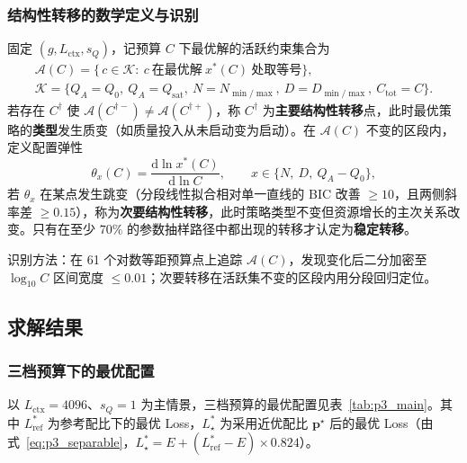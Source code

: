 \subsubsection{结构性转移的数学定义与识别}

\begin{definition}[结构性转移]
固定 $(g,L_{\mathrm{ctx}},s_Q)$，记预算 $C$ 下最优解的活跃约束集合为
\begin{equation}
\begin{gathered}
\mathcal A(C)=\big\{\,c\in\mathcal K:\ c\ \text{在最优解}\ x^*(C)\ \text{处取等号}\big\},\\
\mathcal K=\{Q_A=Q_0,\ Q_A=Q_{\mathrm{sat}},\ N=N_{\min/\max},\ D=D_{\min/\max},\ C_{\mathrm{tot}}=C\}.
\end{gathered}
\label{eq:p3_active}
\end{equation}
若存在 $C^\dagger$ 使 $\mathcal A(C^{\dagger-})\neq\mathcal A(C^{\dagger+})$，称 $C^\dagger$ 为\textbf{主要结构性转移}点，此时最优策略的\textbf{类型}发生质变（如质量投入从未启动变为启动）。在 $\mathcal A(C)$ 不变的区段内，定义配置弹性
\begin{equation}
\theta_x(C)=\frac{\mathrm d\ln x^*(C)}{\mathrm d\ln C},\qquad x\in\{N,\ D,\ Q_A-Q_0\},
\label{eq:p3_elasticity}
\end{equation}
若 $\theta_x$ 在某点发生跳变（分段线性拟合相对单一直线的 BIC 改善 $\ge10$\cite{schwarz1978estimating}，且两侧斜率差 $\ge0.15$），称为\textbf{次要结构性转移}，此时策略类型不变但资源增长的主次关系改变。只有在至少 $70\%$ 的参数抽样路径中都出现的转移才认定为\textbf{稳定转移}。
\end{definition}

识别方法：在 61 个对数等距预算点上追踪 $\mathcal A(C)$，发现变化后二分加密至 $\log_{10}C$ 区间宽度 $\le0.01$；次要转移在活跃集不变的区段内用分段回归定位。

\subsection{求解结果}

\subsubsection{三档预算下的最优配置}

以 $L_{\mathrm{ctx}}=4096$、$s_Q=1$ 为主情景，三档预算的最优配置见表~\ref{tab:p3_main}。其中 $L^*_{\mathrm{ref}}$ 为参考配比下的最优 Loss，$L^*_{\star}$ 为采用近优配比 $\boldsymbol p^\star$ 后的最优 Loss（由式~\eqref{eq:p3_separable}，$L^*_\star=E+(L^*_{\mathrm{ref}}-E)\times0.824$）。


